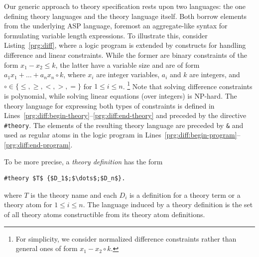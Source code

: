 \documentclass[a4paper,USenglish]{oasics-v2016}
\begin{document}
Our generic approach to theory specification rests upon two languages:
the one defining theory languages and the theory language itself.
Both borrow elements from the underlying ASP language,
foremost an aggregate-like syntax for formulating variable length expressions.
To illustrate this, consider Listing~\ref{prg:diff},
where a logic program is extended by constructs for handling difference and linear constraints.
While the former are binary constraints of the form $x_1-x_2\leq k$, %
the latter have a variable size and are of form
\(
a_1x_1+\dots+a_nx_n\circ k
\),
where $x_i$ are integer variables, $a_i$ and $k$ are integers, and $\circ\in\{\leq,\geq,<,>,=\}$
for $1\leq i\leq n$.%
\footnote{For simplicity, we consider normalized difference constraints rather than general ones of form $x_1-x_2\circ k$.}
Note that solving difference constraints is polynomial, while solving linear equations (over integers) is NP-hard.
The theory language for expressing both types of constraints is defined in Lines~\ref{prg:diff:begin-theory}--\ref{prg:diff:end-theory} and preceded by the directive \lstinline{#theory}.
The elements of the resulting theory language are preceded by \lstinline{&} and used as regular atoms in the logic program in Lines~\ref{prg:diff:begin-program}--\ref{prg:diff:end-program}.
%



To be more precise,
a \emph{theory definition} has the form
\begin{lstlisting}[numbers=none,mathescape=t]
#theory $T$ {$D_1$;$\dots$;$D_n$}.
\end{lstlisting}
where $T$ is the theory name and each $D_i$ is a definition for a theory term or a theory atom for $1\leq i\leq n$.
The language induced by a theory definition is the set of all theory atoms constructible from its theory atom definitions.
\end{document}
